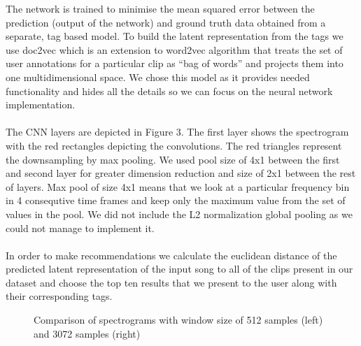 \documentclass[11pt, a4paper]{article}
\begin{document}
    \noindent
    The network is trained to minimise the mean squared error between the
    prediction (output of the network) and ground truth data obtained from
    a separate, tag based model. To build the latent representation from the
    tags we use doc2vec which is an extension to word2vec algorithm that treats
    the set of user annotations for a particular clip as ``bag of words'' and 
    projects them into one multidimensional space. We chose this model as it
    provides needed functionality and hides all the details so we can focus
    on the neural network implementation.
    \\ \\
    \noindent
    The CNN layers are depicted in Figure 3. The first layer shows the
    spectrogram with the red rectangles depicting the convolutions. The red
    triangles represent the downsampling by max pooling. We used pool size
    of 4x1 between the first and second layer for greater dimension reduction
    and size of 2x1 between the rest of layers. Max pool of size 4x1 means that
    we look at a particular frequency bin in 4 consequtive time frames and keep
    only the maximum value from the set of values in the pool. We did not
    include the L2 normalization global pooling as we could not manage to
    implement it.
    \\ \\
    \noindent
    In order to make recommendations we calculate the euclidean distance of the
    predicted latent representation of the input song to all of the clips
    present in our dataset and choose the top ten results that we present to
    the user along with their corresponding tags.

    \begin{figure}
      \centering
      \caption{Comparison of spectrograms with window size of 512 samples
          (left) and 3072 samples (right)}
    \end{figure}
\end{document}
